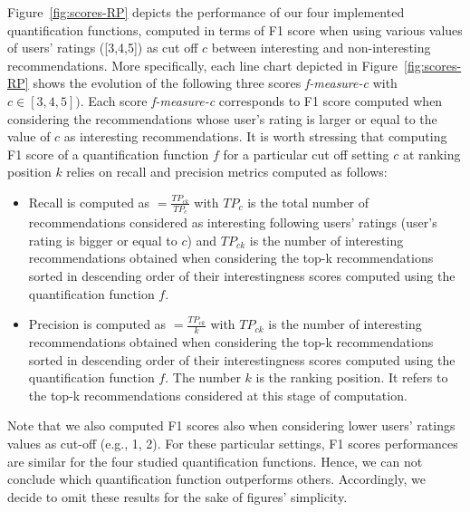Figure~\ref{fig:scores-RP} depicts the performance of our four implemented quantification functions, computed in terms of F1 score when using various values of users' ratings ([3,4,5]) as cut off $c$ between interesting and non-interesting recommendations. More specifically, each line chart depicted in Figure~\ref{fig:scores-RP} shows the evolution of the following three scores \emph{f-measure-c} with $c \in [3,4,5])$.
Each score \emph{f-measure-c} corresponds to F1 score computed when considering the recommendations whose user's rating is larger or equal to the value of $c$ as interesting recommendations.
It is worth stressing that computing F1 score of a quantification function $f$ for a particular cut off setting $c$ at ranking position $k$ relies on recall and precision metrics computed as follows:
\begin{itemize}
\item Recall is computed as $=\frac{TP_{ck}}{TP_{c}}$ with $TP_{c}$ is the total number of recommendations considered as interesting following users' ratings (user's rating is bigger or equal to $c$) and $TP_{ck}$ is the number of interesting recommendations obtained when considering the top-k recommendations sorted in descending order of their interestingness scores computed using the quantification function $f$. 
 
 \item Precision is computed as $=\frac{TP_{ck}}{k}$ with $TP_{ck}$ is the number of interesting recommendations obtained when considering the top-k recommendations sorted in descending order of their interestingness scores computed using the quantification function $f$. The number $k$ is the ranking position. It refers to the top-k  recommendations considered at this stage of computation. 

\end{itemize} 

Note that we also computed F1 scores also when considering lower users' ratings values as cut-off (e.g., 1, 2). For these particular settings, F1 scores performances are similar for the four studied quantification functions. Hence, we can not conclude which quantification function outperforms others.
Accordingly, we decide to omit these results for the sake of figures' simplicity. 






